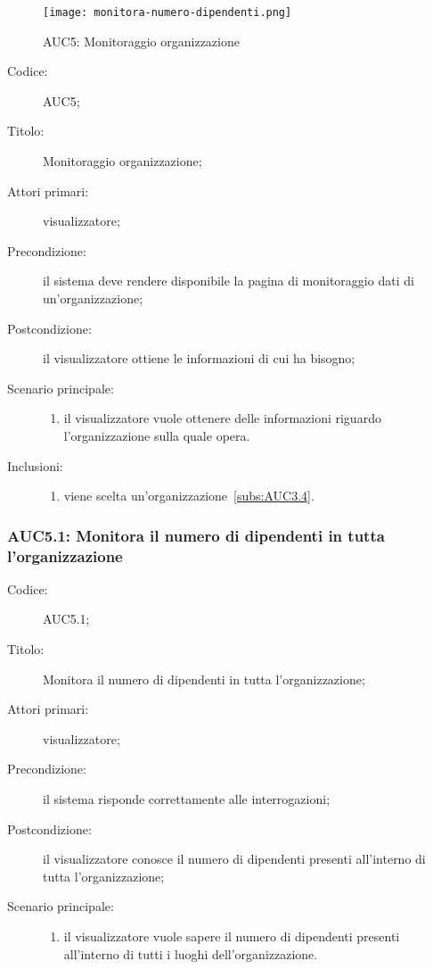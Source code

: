 \documentclass[../../../analisi-dei-requisiti.tex]{subfiles}
\begin{document}
\begin{figure}[H]
  \centering
  \texttt{[image: monitora-numero-dipendenti.png]}
  \caption{AUC5: Monitoraggio organizzazione}%
  \label{fig:AUC5}
\end{figure}

\begin{description}
  \item[Codice:] AUC5;
  \item[Titolo:] Monitoraggio organizzazione;
  \item[Attori primari:] visualizzatore;
  \item[Precondizione:] il sistema deve rendere disponibile la pagina di monitoraggio dati di un'organizzazione;
  \item[Postcondizione:] il visualizzatore ottiene le informazioni di cui ha bisogno;
  \item[Scenario principale:]
  \begin{enumerate}
    \item il visualizzatore vuole ottenere delle informazioni riguardo l'organizzazione sulla quale opera.
  \end{enumerate}
  \item[Inclusioni:]
        \begin{enumerate}
          \item viene scelta un'organizzazione~\ref{subs:AUC3.4}.
        \end{enumerate}
\end{description}

\subsubsection{AUC5.1: Monitora il numero di dipendenti in tutta l'organizzazione}%
\label{subs:AUC5.1}
\begin{description}
  \item[Codice:] AUC5.1;
  \item[Titolo:] Monitora il numero di dipendenti in tutta l'organizzazione;
  \item[Attori primari:] visualizzatore;
  \item[Precondizione:] il sistema risponde correttamente alle interrogazioni;
  \item[Postcondizione:] il visualizzatore conosce il numero di dipendenti presenti all'interno di tutta l'organizzazione;
  \item[Scenario principale:]
  \begin{enumerate}
    \item il visualizzatore vuole sapere il numero di dipendenti presenti all'interno di tutti i luoghi dell'organizzazione.
  \end{enumerate}
\end{description}
\end{document}
